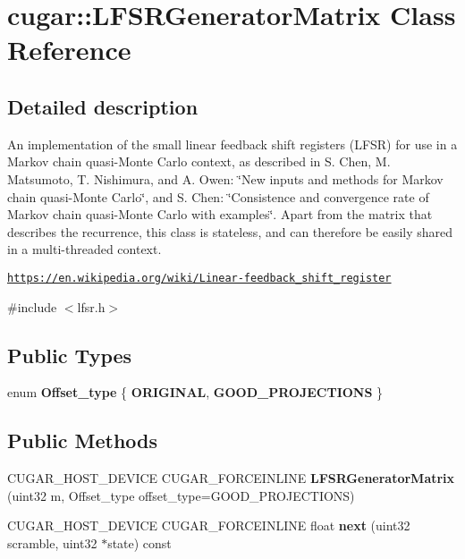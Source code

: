 \hypertarget{classcugar_1_1_l_f_s_r_generator_matrix}{}\section{cugar\+:\+:L\+F\+S\+R\+Generator\+Matrix Class Reference}
\label{classcugar_1_1_l_f_s_r_generator_matrix}


\subsection{Detailed description}
An implementation of the small linear feedback shift registers (L\+F\+SR) for use in a Markov chain quasi-\/\+Monte Carlo context, as described in S. Chen, M. Matsumoto, T. Nishimura, and A. Owen\+: \char`\"{}\+New inputs and methods for Markov
chain quasi-\/\+Monte Carlo\char`\"{}, and S. Chen\+: \char`\"{}\+Consistence and convergence rate of
\+Markov chain quasi-\/\+Monte Carlo with examples\char`\"{}. Apart from the matrix that describes the recurrence, this class is stateless, and can therefore be easily shared in a multi-\/threaded context.

\href{https://en.wikipedia.org/wiki/Linear-feedback_shift_register}{\tt https\+://en.\+wikipedia.\+org/wiki/\+Linear-\/feedback\+\_\+shift\+\_\+register} 

{\ttfamily \#include $<$lfsr.\+h$>$}

\subsection*{Public Types}
\begin{DoxyCompactItemize}
\item 
\mbox{\label{classcugar_1_1_l_f_s_r_generator_matrix_a1e210b57aecc9bddd4fd7e3c99bae0d5}} 
enum {\bfseries Offset\+\_\+type} \{ {\bfseries O\+R\+I\+G\+I\+N\+AL}, 
{\bfseries G\+O\+O\+D\+\_\+\+P\+R\+O\+J\+E\+C\+T\+I\+O\+NS}
 \}
\end{DoxyCompactItemize}
\subsection*{Public Methods}
\begin{DoxyCompactItemize}
\item 
C\+U\+G\+A\+R\+\_\+\+H\+O\+S\+T\+\_\+\+D\+E\+V\+I\+CE C\+U\+G\+A\+R\+\_\+\+F\+O\+R\+C\+E\+I\+N\+L\+I\+NE {\bfseries L\+F\+S\+R\+Generator\+Matrix} (uint32 m, Offset\+\_\+type offset\+\_\+type=G\+O\+O\+D\+\_\+\+P\+R\+O\+J\+E\+C\+T\+I\+O\+NS)
\item 
C\+U\+G\+A\+R\+\_\+\+H\+O\+S\+T\+\_\+\+D\+E\+V\+I\+CE C\+U\+G\+A\+R\+\_\+\+F\+O\+R\+C\+E\+I\+N\+L\+I\+NE float {\bfseries next} (uint32 scramble, uint32 $\ast$state) const
\end{DoxyCompactItemize}

